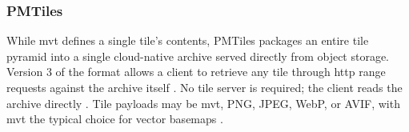 


\subsubsection{PMTiles}
\label{background:spatial-data-formats-and-storage-models:file-formats:pmtiles}
While \acrshort{mvt} defines a single tile's contents, PMTiles packages an entire tile pyramid into a single cloud-native archive served directly from object storage. Version 3 of the format allows a client to retrieve any tile through \acrshort{http} range requests against the archive itself \parencite{protomaps2024_pmtiles_specification_v3, cngfoundation2024_pmtiles_guide}. No tile server is required; the client reads the archive directly \parencite{cngfoundation2024_pmtiles_guide}. Tile payloads may be \acrshort{mvt}, PNG, JPEG, WebP, or AVIF, with \acrshort{mvt} the typical choice for vector basemaps \parencite{protomaps2024_pmtiles_specification_v3}.

